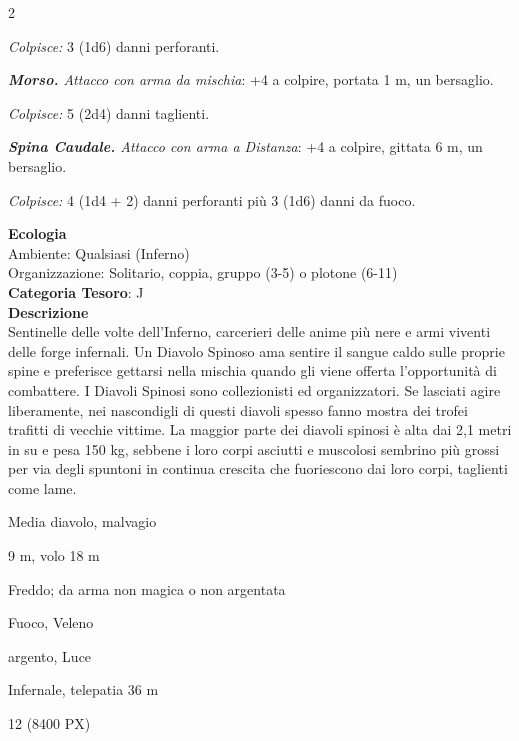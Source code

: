 \begin{multicols}{2}
{\emph{Colpisce:} 3 (1d6) danni perforanti.

\emph{\textbf{Morso.} Attacco con arma da mischia}: +4 a colpire, portata 1 m, un bersaglio.

\emph{Colpisce:} 5 (2d4) danni taglienti.

\emph{\textbf{Spina Caudale.} Attacco con arma a Distanza}: +4 a colpire, gittata 6 m, un bersaglio.

\emph{Colpisce:} 4 (1d4 + 2) danni perforanti più 3 (1d6) danni da fuoco.

\textbf{Ecologia}\\
Ambiente: Qualsiasi (Inferno)\\
Organizzazione: Solitario, coppia, gruppo (3-5) o plotone (6-11)\\
\textbf{Categoria Tesoro}: J\\
\textbf{Descrizione}\\
Sentinelle delle volte dell'Inferno, carcerieri delle anime più nere e armi viventi delle forge infernali. Un Diavolo Spinoso ama sentire il sangue caldo sulle proprie spine e preferisce gettarsi nella mischia quando gli viene offerta l'opportunità di combattere.
I Diavoli Spinosi sono collezionisti ed organizzatori. Se lasciati agire liberamente, nei nascondigli di questi diavoli spesso fanno mostra dei trofei trafitti di vecchie vittime.
La maggior parte dei diavoli spinosi è alta dai 2,1 metri in su e pesa 150 kg, sebbene i loro corpi asciutti e muscolosi sembrino più grossi per via degli spuntoni in continua crescita che fuoriescono dai loro corpi, taglienti come lame.

\begin{description}[noitemsep, topsep=0pt, parsep=0pt, partopsep=0pt, itemsep=1pt, leftmargin=2.35cm,  labelwidth=2.2cm, itemindent=0cm, listparindent=0pt] %
\setlength{\baselineskip}{10pt}
\item[\textbf{Taglia/Tipo}] Media diavolo, malvagio
\item[\textbf{Caratt.}] 
\item[\textbf{Punti Ferita}] 
\item[\textbf{Movimento}] 9 m, volo 18 m
\item[\textbf{Tiri Salvez.}] 
\item[\textbf{Res. Danni}] Freddo; da arma non magica o non argentata
\item[\textbf{Imm. Danni}] Fuoco, Veleno
\item[\textbf{Vulnerabilità}] argento, Luce
\item[\textbf{Sensi}] 
\item[\textbf{Linguaggi}] Infernale, telepatia 36 m
\item[\textbf{Sfida}] 12 (8400 PX)
\end{description}
\smallskip

}
\end{multicols}

